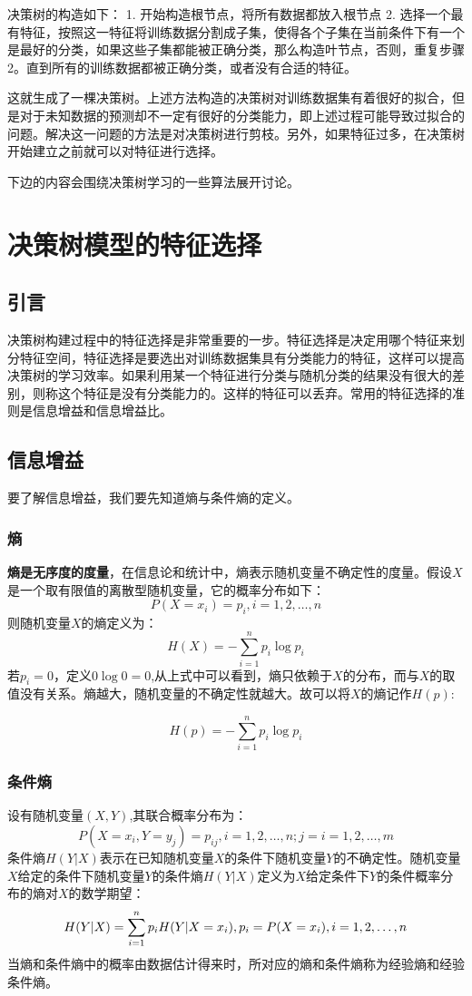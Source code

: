 \documentclass[a4paper,12pt]{book}
\begin{document}
    决策树的构造如下：
    1. 开始构造根节点，将所有数据都放入根节点
    2. 选择一个最有特征，按照这一特征将训练数据分割成子集，使得各个子集在当前条件下有一个是最好的分类，如果这些子集都能被正确分类，那么构造叶节点，否则，重复步骤2。直到所有的训练数据都被正确分类，或者没有合适的特征。

    这就生成了一棵决策树。上述方法构造的决策树对训练数据集有着很好的拟合，但是对于未知数据的预测却不一定有很好的分类能力，即上述过程可能导致过拟合的问题。解决这一问题的方法是对决策树进行剪枝。另外，如果特征过多，在决策树开始建立之前就可以对特征进行选择。

    下边的内容会围绕决策树学习的一些算法展开讨论。

    \section{决策树模型的特征选择}
    \subsection{引言}
    决策树构建过程中的特征选择是非常重要的一步。特征选择是决定用哪个特征来划分特征空间，特征选择是要选出对训练数据集具有分类能力的特征，这样可以提高决策树的学习效率。如果利用某一个特征进行分类与随机分类的结果没有很大的差别，则称这个特征是没有分类能力的。这样的特征可以丢弃。常用的特征选择的准则是信息增益和信息增益比。
    
    \subsection{信息增益}
    要了解信息增益，我们要先知道熵与条件熵的定义。
    \subsubsection{熵}
    \textbf{熵是无序度的度量}，在信息论和统计中，熵表示随机变量不确定性的度量。假设$X$是一个取有限值的离散型随机变量，它的概率分布如下：
    $$
    P(X=x_i)=p_i, i = 1,2,\dots,n
    $$
    则随机变量$X$的熵定义为：
    $$
    H(X) = -\sum_{i=1}^{n}p_i\log p_i
    $$ 
    $若p_i=0，定义0 \log 0 = 0$,从上式中可以看到，熵只依赖于$X$的分布，而与$X$的取值没有关系。熵越大，随机变量的不确定性就越大。故可以将$X的熵记作H(p):$
    
    $$
    H(p) = -\sum_{i=1}^{n}p_i\log p_i
    $$ 
    \subsubsection{条件熵}
    设有随机变量$(X,Y)$,其联合概率分布为：
    $$
    P(X=x_i, Y= y_j)=p_{ij}, i = 1,2, \dots, n; j = i = 1,2, \dots, m
    $$
    条件熵$H(Y|X)$表示在已知随机变量$X$的条件下随机变量$Y$的不确定性。随机变量$X$给定的条件下随机变量$Y$的条件熵$H(Y|X)$定义为$X$给定条件下$Y$的条件概率分布的熵对$X$的数学期望：
    $$
    H(Y|X)=\sum_{i=1}^{n}p_iH(Y|X=x_i), \\
    p_i=P(X=x_i), i = 1,2,\dots,n
    $$
    当熵和条件熵中的概率由数据估计得来时，所对应的熵和条件熵称为经验熵和经验条件熵。
    
\end{document}
